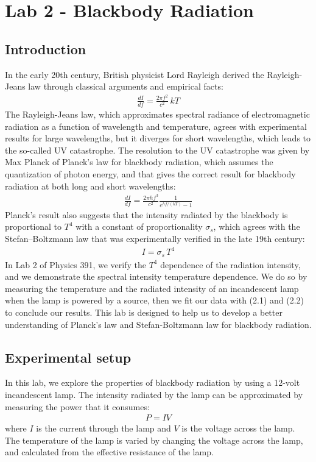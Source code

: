 \documentclass[11pt]{book}
\theoremstyle{break}
\theoremstyle{break}
\begin{document}
\newpage
\tableofcontents
{}


\setcounter{chapter}{2}
\chapter*{Lab 2 - Blackbody Radiation}
\section{Introduction}
In the early 20th century, British physicist Lord Rayleigh derived the Rayleigh-Jeans law through classical arguments and empirical facts: 
\begin{align*}
\frac{dI}{df} = \frac{2\pi f^2}{c^2}\, kT \tag{Rayleigh-Jeans law}
\end{align*}
The Rayleigh-Jeans law, which approximates spectral radiance of electromagnetic radiation as a function of wavelength and temperature, agrees with experimental results for large wavelengths, but it diverges for short wavelengths, which leads to the so-called UV catastrophe. The resolution to the UV catastrophe was given by Max Planck of Planck's law for blackbody radiation, which assumes the quantization of photon energy, and that gives the correct result for blackbody radiation at both long and short wavelengths:
\begin{align}
\frac{dI}{df} = \frac{2\pi hf^3}{c^2}\frac{1}{e^{hf/(kT)}-1}
\end{align} 
Planck's result also suggests that the intensity radiated by the blackbody is proportional to $T^4$ with a constant of proportionality $\sigma_s$, which agrees with the Stefan–Boltzmann law that was experimentally verified in the late 19th century: 
\begin{align}
I = \sigma_s\, T^4
\end{align}
In Lab 2 of Physics 391, we verify the $T^4$ dependence of the radiation intensity, and we demonstrate the spectral intensity temperature dependence. We do so by measuring the temperature and the radiated intensity of an incandescent lamp when the lamp is powered by a source, then we fit our data with (2.1) and (2.2) to conclude our results. This lab is designed to help us to develop a better understanding of Planck's law and Stefan-Boltzmann law for blackbody radiation.  

\hfill\break
\hfill\break
\newpage
\section{Experimental setup}
In this lab, we explore the properties of blackbody radiation by using a 12-volt incandescent lamp. The intensity radiated by the lamp can be approximated by measuring the power that it consumes:
\begin{align}
P = IV
\end{align}
where $I$ is the current through the lamp and $V$ is the voltage across the lamp. The temperature of the lamp is varied by changing the voltage across the lamp, and calculated from the effective resistance of the lamp.\\
\end{document}
